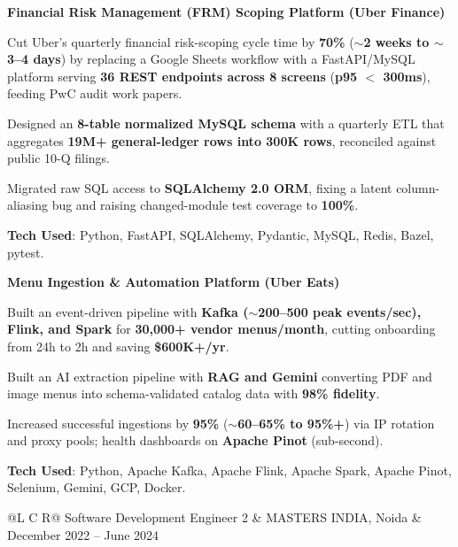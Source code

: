 \textcolor{Project}{\textbf{Financial Risk Management (FRM) Scoping Platform (Uber Finance)}}
\vspace{-1ex}
\begin{zitemize}
    \item Cut Uber's quarterly financial risk-scoping cycle time by \textbf{70\%} (\textbf{$\sim$2 weeks to $\sim$3--4 days}) by replacing a Google Sheets workflow with a FastAPI/MySQL platform serving \textbf{36 REST endpoints across 8 screens} (\textbf{p95 $<$ 300ms}), feeding PwC audit work papers.
    \item Designed an \textbf{8-table normalized MySQL schema} with a quarterly ETL that aggregates \textbf{19M+ general-ledger rows into 300K rows}, reconciled against public 10-Q filings.
    \item Migrated raw SQL access to \textbf{SQLAlchemy 2.0 ORM}, fixing a latent column-aliasing bug and raising changed-module test coverage to \textbf{100\%}.
    \item \textbf{Tech Used}: Python, FastAPI, SQLAlchemy, Pydantic, MySQL, Redis, Bazel, pytest.
\end{zitemize}
\vspace{0.3ex}

\textcolor{Project}{\textbf{Menu Ingestion \& Automation Platform (Uber Eats)}}
\vspace{-1ex}
\begin{zitemize}
    \item Built an event-driven pipeline with \textbf{Kafka ($\sim$200--500 peak events/sec), Flink, and Spark} for \textbf{30,000+ vendor menus/month}, cutting onboarding from 24h to 2h and saving \textbf{\$600K+/yr}.
    \item Built an AI extraction pipeline with \textbf{RAG and Gemini} converting PDF and image menus into schema-validated catalog data with \textbf{98\% fidelity}.
    \item Increased successful ingestions by \textbf{95\%} (\textbf{$\sim$60--65\% to 95\%+}) via IP rotation and proxy pools; health dashboards on \textbf{Apache Pinot} (sub-second).
    \item \textbf{Tech Used}: Python, Apache Kafka, Apache Flink, Apache Spark, Apache Pinot, Selenium, Gemini, GCP, Docker.
\end{zitemize}

\vspace{1ex}
\noindent
\begin{tabularx}{\textwidth}{@{}L C R@{}}
\textcolor{role}{Software Development Engineer 2} & \textcolor{company}{MASTERS INDIA, Noida} & \textcolor{date}{December 2022 -- June 2024}\\
\end{tabularx}
\vspace{-2ex}


